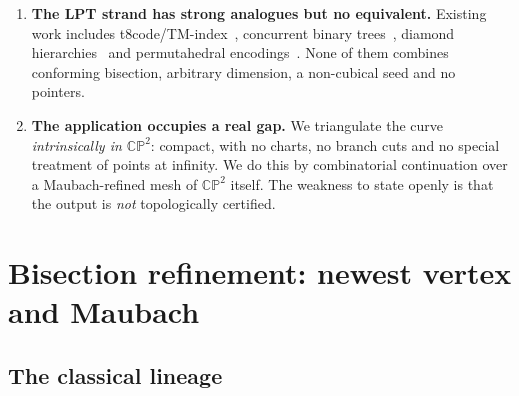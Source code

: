 \documentclass[11pt]{article}
\newcommand{\CP}{\mathbb{CP}}
\begin{document}
\begin{enumerate}[leftmargin=*,itemsep=4pt]
\item \textbf{The LPT strand has strong analogues but no equivalent.}
  Existing work includes t8code/TM-index~\cite{bursteddeholke2016},
  concurrent binary trees~\cite{dupuy2020}, diamond
  hierarchies~\cite{weissdefloriani2011} and permutahedral
  encodings~\cite{bkw2023}. None of them combines conforming bisection,
  arbitrary dimension, a non-cubical seed and no pointers.

\item \textbf{The application occupies a real gap.} We triangulate the curve
  \emph{intrinsically in $\CP^2$}: compact, with no charts, no branch cuts
  and no special treatment of points at infinity. We do this by
  combinatorial continuation over a Maubach-refined mesh of $\CP^2$ itself.
  The weakness to state openly is that the output is \emph{not}
  topologically certified.
\end{enumerate}

\section{Bisection refinement: newest vertex and Maubach}
\label{sec:bisection}

\subsection{The classical lineage}
\end{document}
